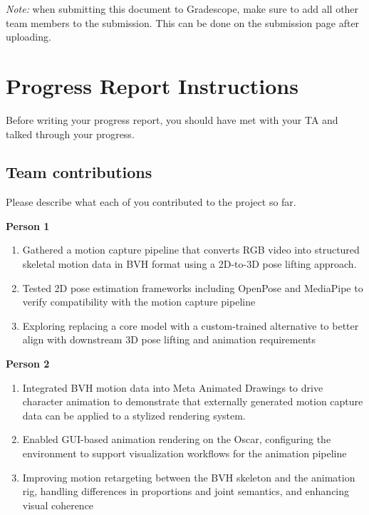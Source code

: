 \emph{Note:} when submitting this document to Gradescope, make sure to add all other team members to the submission. This can be done on the submission page after uploading.

\section*{Progress Report Instructions}

Before writing your progress report, you should have met with your TA and talked through your progress.

\subsection*{Team contributions}

Please describe what each of you contributed to the project so far.

\textbf{Person 1}
\begin{enumerate}
  \item Gathered a motion capture pipeline that converts RGB video into structured skeletal motion data in BVH format using a 2D-to-3D pose lifting approach.
  \item Tested 2D pose estimation frameworks including OpenPose and MediaPipe to verify compatibility with the motion capture pipeline
  \item Exploring replacing a core model with a custom-trained alternative to better align with downstream 3D pose lifting and animation requirements
\end{enumerate}

\textbf{Person 2}
\begin{enumerate}
  \item Integrated BVH motion data into Meta Animated Drawings to drive character animation to demonstrate that externally generated motion capture data can be applied to a stylized rendering system.
  \item Enabled GUI-based animation rendering on the Oscar, configuring the environment to support visualization workflows for the animation pipeline
  \item Improving motion retargeting between the BVH skeleton and the animation rig, handling differences in proportions and joint semantics, and enhancing visual coherence
\end{enumerate}



